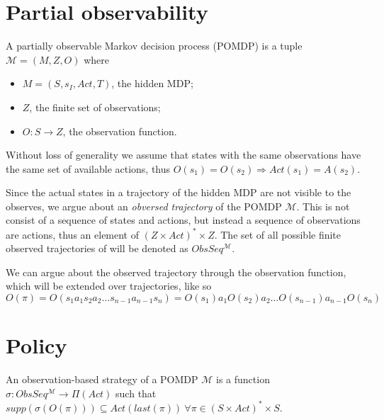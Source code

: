 
\section*{Partial observability}

\begin{definition}[POMDP]
	A partially observable Markov decision process (POMDP) is a tuple $\mathcal{M}=(M, Z, O)$ where 
	\begin{itemize}
		\item $M=(S,s_I,Act,T)$, the hidden MDP;
		\item $Z$, the finite set of observations;
		\item $O:S\to Z$, the observation function. %
	\end{itemize}
\end{definition}

Without loss of generality we assume that states with the same observations have the same set of available actions, thus $O(s_1)=O(s_2)\Rightarrow Act(s_1)=A(s_2)$.

Since the actual states in a trajectory of the hidden MDP are not visible to the observes, we argue about an \textit{obversed trajectory} of the POMDP $\mathcal{M}$. This is not consist of a sequence of states and actions, but instead a sequence of observations are actions, thus an element of $(Z\times Act)^*\times Z$. The set of all possible finite observed trajectories of will be denoted as $ObsSeq^{\mathcal{M}}$.

We can argue about the observed trajectory through the observation function, which will be extended over trajectories, like so
\[O(\pi)=O(s_1 a_1 s_2 a_2\dots s_{n-1} a_{n-1} s_n) = O(s_1) a_1 O(s_2) a_2\dots O(s_{n-1}) a_{n-1} O(s_n)\]

\section*{Policy}
\begin{definition}
	An observation-based strategy of a POMDP $\mathcal{M}$ is a function $\sigma:ObsSeq^{\mathcal{M}}\to\Pi(Act)$ such that $supp(\sigma(O(\pi)))\subseteq Act (last(\pi))\ \forall \pi\in(S\times Act)^*\times S$.
\end{definition}